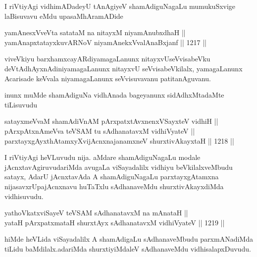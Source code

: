\begin{center}
I riVtiyAgi vidhimADadeyU tAnAgiyeV shamAdiguNagaLu mumukuSxvige laBisuvavu eMdu upasaMhAramADide
\end{center}


\begin{shl}
yamAnesxVveVta satataM na nitayxM niyamAnubxdhaH || \\
yamAnapxtatayxkuvARNoV niyamAnekxVvalAnaBxjanf ||  1217 ||  
\end{shl}

\begin{artha}
viveVkiyu barxhamxcayARdiyamagaLanunx nitayxvUseVvisabeVku deVtAdhAyxnAdiniyamagaLanunx nitayxvU seVvisabeVkilalx, yamagaLanunx Acarisade keVvala niyamagaLanunx seVvisuvavanu patitanAguvanu.
\end{artha}

\begin{center}
inunx muMde shamAdiguNa vidhAnada bageyanunx sidAdhxMtadaMte tiLisuvudu
\end{center}


\begin{shl}
satayxmeVvaM shamAdiVnAM pArxpatxtAvxnenxVSayxteV vidhiH || \\
pArxpAtxnAmeVva teVSAM tu sAdhanatavxM vidhiVyateV || \\
parxtayxgAyxthAtamxyXvijAcnxnajanamxneV shurxtivAkayxtaH ||  1218 ||  
\end{shl}

\begin{artha}
I riVtiyAgi heVLuvudu nija. aMdare shamAdiguNagaLu modale jAcnxtavAgiruvudariMda avugaLa viSayadalilx vidhiyu beVkilalxveMbudu satayx, AdarU jAcnxtavAda A shamAdiguNagaLu parxtayxgAtamxna nijasavxrUpajAcnxnavu huTaTxlu sAdhanaveMdu shurxtivAkayxdiMda vidhisuvudu.
\end{artha}


\begin{shl}
yathoVkatxviSayeV teVSAM sAdhanatavxM na mAnataH || \\
yataH pArxpatxmataH shurxtAyx sAdhanatavxM vidhiVyateV ||  1219 ||  
\end{shl}

\begin{artha}
hiMde heVLida viSayadalilx A shamAdigaLu sAdhanaveMbudu parxmANadiMda tiLidu baMdilalx.adariMda shurxtiyiMdaleV sAdhanaveMdu vidhisalapxDuvudu.
\end{artha}

